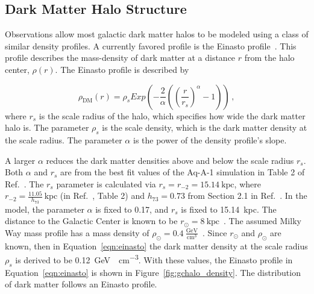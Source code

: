 \begin{table}[]
    \end{table}

    \FloatBarrier

  \subsection{Dark Matter Halo Structure}\label{dm_spatial}
    
    Observations allow most galactic dark matter halos to be modeled using a class of similar density profiles.
    A currently favored profile is the Einasto profile~\cite{einastoprofile1,einastoprofile2}.
    This profile describes the mass-density of dark matter at a distance $r$ from the halo center, $\rho(r)$.
    The Einasto profile is described by

    \begin{equation} \label{eqn:einasto}
      \rho_{\textrm{DM}} \left( r \right) = \rho_{s} Exp \left( - \frac{2}{\alpha} \left( {\left( \frac{r}{r_s} \right)}^{\alpha} - 1 \right) \right) \,,
    \end{equation}
    where $r_s$ is the scale radius of the halo, which specifies how wide the dark matter halo is.
    The parameter $\rho_s$ is the scale density, which is the dark matter density at the scale radius.
    The parameter $\alpha$ is the power of the density profile's slope.
    
    A larger $\alpha$ reduces the dark matter densities above and below the scale radius $r_s$.
    Both $\alpha$ and $r_s$ are from the best fit values of the Aq-A-1 simulation in Table 2 of Ref.~\cite{mw_halo_params}.
    The $r_s$ parameter is calculated via $r_s=r_{-2}=15.14\:\textrm{kpc}$, where $r_{-2}=\frac{11.05}{h_{73}}\:\textrm{kpc}$ (in Ref.~\cite{mw_halo_params}, Table 2) and $h_{73}=0.73$ from Section 2.1 in Ref.~\cite{mw_halo_params}.
    In the model, the parameter $\alpha$ is fixed to 0.17, and $r_s$ is fixed to \SI{15.14}{kpc}.
    The distance to the Galactic Center is known to be $r_\odot=8\:\textrm{kpc}$~\cite{gc_distance_1,gc_distance_2,gc_distance_3}.
    The assumed Milky Way mass profile has a mass density of $\rho_\odot = 0.4\:\frac{\textrm{GeV}}{\textrm{cm}^3}$~\cite{local_dm_density,direct_dm_astrophysical_uncertainties}.
    Since $r_\odot$ and $\rho_\odot$ are known, then in Equation~\ref{eqn:einasto} the dark matter density at the scale radius $\rho_s$ is derived to be \SI{0.12}{\GeV{}\per\cm^3}.
    With these values, the Einasto profile in Equation~\ref{eqn:einasto} is shown in Figure~\ref{fig:gchalo_density}.
    The distribution of dark matter follows an Einasto profile.
  
